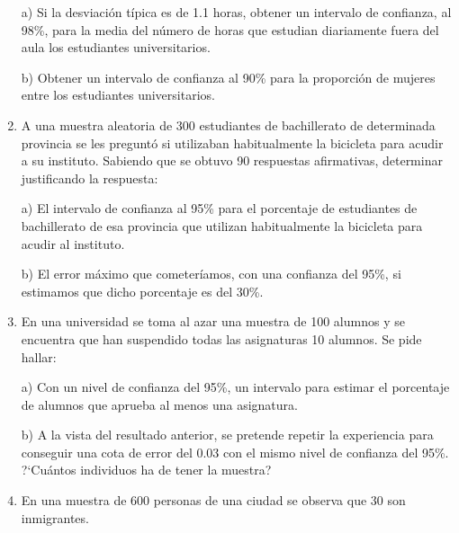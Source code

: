 \begin{adjustwidth}{20pt}{10pt}
\begin{enumerate}[PB. 1. ]
a) Si la desviación típica es de 1.1 horas, obtener un intervalo de confianza, al 98\%, para la media del número de horas que estudian diariamente fuera del aula los estudiantes universitarios.

b) Obtener un intervalo de confianza al 90\% para la proporción de mujeres entre los estudiantes universitarios.
		
		\hspace{-1cm}\vspace{1cm}
		
	\item 	A una muestra aleatoria de 300 estudiantes de bachillerato de determinada provincia se les preguntó si utilizaban habitualmente la bicicleta para acudir a su instituto. Sabiendo que se obtuvo 90 respuestas afirmativas, determinar justificando la respuesta:

a) El intervalo de confianza al 95\% para el porcentaje de estudiantes de bachillerato de esa provincia que utilizan habitualmente la bicicleta para acudir al instituto.

b) El error máximo que cometeríamos, con una confianza del 95\%, si estimamos que dicho porcentaje es del 30\%.
		
		\hspace{-1cm}\vspace{1cm}
		
	\item 	En una universidad se toma al azar una muestra de 100 alumnos y se encuentra que han suspendido todas las asignaturas 10 alumnos. Se pide hallar:
	
a) Con un nivel de confianza del 95\%, un intervalo para estimar el porcentaje de alumnos que aprueba al menos una asignatura.

b) A la vista del resultado anterior, se pretende repetir la experiencia para conseguir una cota de error del 0.03 con el mismo nivel de confianza del 95\%. ?`Cuántos individuos ha de tener la muestra?
		
		\hspace{-1cm}\vspace{1cm}
		
	\item 	En una muestra de 600 personas de una ciudad se observa que 30 son inmigrantes.


\end{enumerate}
\end{adjustwidth}
